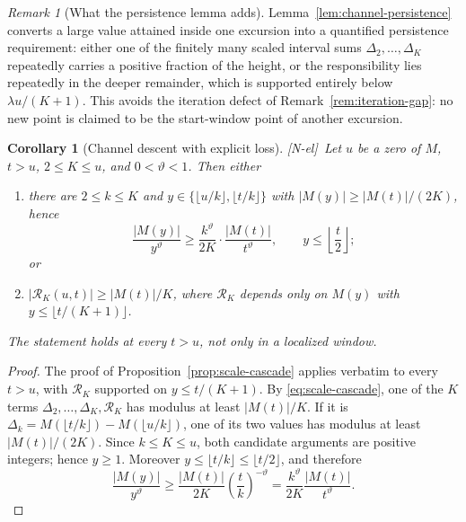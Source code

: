 \documentclass[11pt,reqno]{amsart}
\numberwithin{equation}{section}
\theoremstyle{plain}
\newtheorem{corollary}[theorem]{Corollary}
\theoremstyle{definition}
\theoremstyle{remark}
\newtheorem{remark}[theorem]{Remark}
\newcommand{\tagNE}{\textup{[N-el]}}
\begin{document}
\begin{remark}[What the persistence lemma adds]
\label{rem:persistence-content}
Lemma~\ref{lem:channel-persistence} converts a
large value attained inside one excursion into a quantified persistence
requirement: either one of the finitely many scaled interval sums
$\Delta_2,\ldots,\Delta_K$ repeatedly carries a positive fraction of the
height, or the responsibility lies repeatedly in the deeper remainder,
which is supported entirely below $\lambda u/(K+1)$.  This avoids the
iteration defect of Remark~\ref{rem:iteration-gap}: no new point is claimed
to be the start-window point of another excursion.
\end{remark}
\begin{corollary}[Channel descent with explicit loss]
\label{cor:channel-descent}
\tagNE\ Let $u$ be a zero of $M$, $t>u$, $2\le K\le u$, and $0<\vartheta<1$. Then either
\begin{enumerate}[label=\textup{(\roman*)}]
\item there are $2\le k\le K$ and $y\in\{\lfloor u/k\rfloor,\lfloor t/k\rfloor\}$
with $|M(y)|\ge|M(t)|/(2K)$, hence
\begin{equation}
\frac{|M(y)|}{y^\vartheta}\ge\frac{k^\vartheta}{2K}\cdot\frac{|M(t)|}{t^\vartheta},
\qquad y\le\left\lfloor\frac t2\right\rfloor;
\end{equation}
or
\item $|\mathcal R_K(u,t)|\ge|M(t)|/K$, where $\mathcal R_K$ depends only on
$M(y)$ with $y\le\lfloor t/(K+1)\rfloor$.
\end{enumerate}
The statement holds at every $t>u$, not only in a localized window.
\end{corollary}

\begin{proof}
The proof of Proposition~\ref{prop:scale-cascade} applies verbatim to every
$t>u$, with $\mathcal R_K$ supported on $y\le t/(K+1)$. By \eqref{eq:scale-cascade}, one of the $K$ terms
$\Delta_2,\dots,\Delta_K,\mathcal R_K$ has modulus at least $|M(t)|/K$. If it is
$\Delta_k=M(\lfloor t/k\rfloor)-M(\lfloor u/k\rfloor)$, one of its two values
has modulus at least $|M(t)|/(2K)$. Since $k\le K\le u$, both candidate
arguments are positive integers; hence $y\ge1$. Moreover
$y\le\lfloor t/k\rfloor\le\lfloor t/2\rfloor$, and therefore
\begin{equation}
 \frac{|M(y)|}{y^\vartheta}
 \ge \frac{|M(t)|}{2K}\left(\frac{t}{k}\right)^{-\vartheta}
 =\frac{k^\vartheta}{2K}\frac{|M(t)|}{t^\vartheta}.
\end{equation}
\end{proof}
\end{document}
